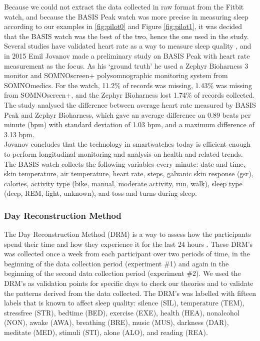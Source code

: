 \documentclass[12pt]{article} %
\begin{document}
Because we could not extract the data collected in raw format from the Fitbit watch, and because the BASIS Peak watch was more precise in measuring sleep according to our examples in \ref{fig:pilot0} and Figure \ref{fig:pilot1}, it was decided that the BASIS watch was the best of the two, hence the one used in the study. \\

Several studies have validated heart rate as a way to measure sleep quality \cite{heartratesleep}\cite{heartrateagain}, and in 2015 Emil Jovanov \cite{EmilBasis} made a preliminary study on BASIS Peak with heart rate measurement as the focus. As his `ground truth' he used a Zephyr Bioharness 3 monitor and SOMNOscreen+ polysomnographic monitoring system from SOMNOmedics. For the watch, 11.2\% of records was missing, 1.43\% was missing from SOMNOscreen+, and the Zephyr Bioharness lost 1.74\% of records collected. The study analysed the difference between average heart rate measured by BASIS Peak and Zephyr Bioharness, which gave an average difference on 0.89 beats per minute (bpm) with standard deviation of 1.03 bpm, and a maximum difference of 3.13 bpm. \\

Jovanov concludes that the technology in smartwatches today is efficient enough to perform longitudinal monitoring and analysis on health and related trends. \\

The BASIS watch collects the following variables every minute: date and time, skin temperature, air temperature, heart rate, steps, galvanic skin response (gsr), calories, activity type (bike, manual, moderate activity, run, walk), sleep type (deep, REM, light, unknown), and toss and turns during sleep. 

\subsubsection{Day Reconstruction Method}
The Day Reconstruction Method (DRM) is a way to assess how the participants spend their time and how they experience it for the last 24 hours \cite{drm}. These DRM's was collected once a week from each participant over two periods of time, in the beginning of the data collection period (experiment \#1) and again in the beginning of the second data collection period (experiment \#2). We used the DRM's as validation points for specific days to check our theories and to validate the patterns derived from the data collected. The DRM's was labelled with fifteen labels that is known to affect sleep quality: silence (SIL), temperature (TEM), stressfree (STR), bedtime (BED), exercise (EXE), health (HEA), nonalcohol (NON), awake (AWA), breathing (BRE), music (MUS), darkness (DAR), meditate (MED), stimuli (STI), alone (ALO), and reading (REA). 
\end{document}
